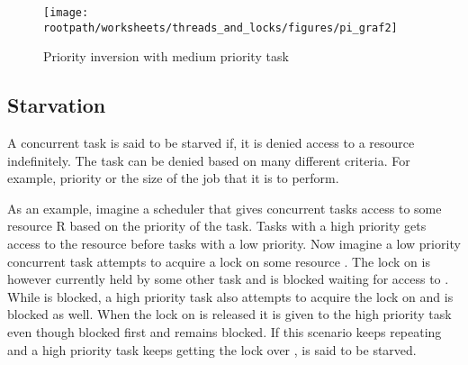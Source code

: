 \begin{figure}[htbp]
\centering
 \texttt{[image: \\rootpath/worksheets/threads\_and\_locks/figures/pi\_graf2]} 
 \caption{Priority inversion with medium priority task}
\label{fig:priority_inversion_m}
\end{figure}
\subsection{Starvation}
A concurrent task is said to be starved if, it is denied access to a resource indefinitely\cite[p. 459]{tanenbaum2008modern}. The task can be denied based on many different criteria. For example, priority or the size of the job that it is to perform.

As an example, imagine a scheduler that gives concurrent tasks access to some resource R based on the priority of the task. Tasks with a high priority gets access to the resource before tasks with a low priority. Now imagine a low priority concurrent task  attempts to acquire a lock on some resource . The lock on  is however currently held by some other task and  is blocked waiting for access to . While  is blocked, a high priority task  also attempts to acquire the lock on  and is blocked as well. When the lock on  is released it is given to the high priority task  even though  blocked first and  remains blocked. If this scenario keeps repeating and a high priority task keeps getting the lock over ,  is said to be starved.


